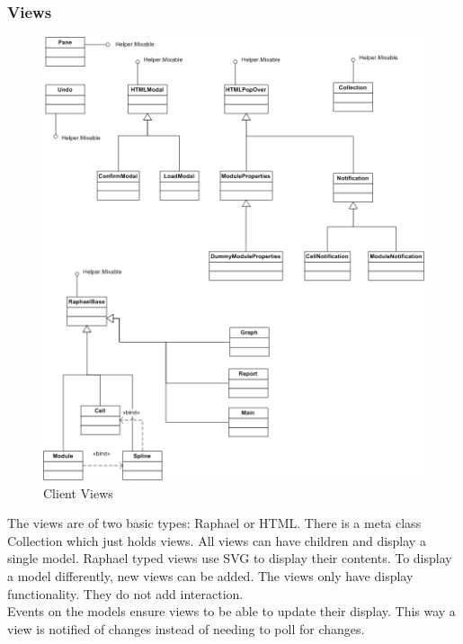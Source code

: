 \documentclass{report}
\begin{document}
				\subsubsection{Views}
					\begin{figure}[htb]
						\begin{center}
							\includegraphics[scale=0.675]{views.png}
							\caption{Client Views}
							\label{fig: cmodels}
						\end{center}
					\end{figure}	

					The views are of two basic types: Raphael or HTML. There is a meta class Collection which just holds views. All views can have children and display a single model. Raphael typed views use SVG to display their contents. To display a model differently, new views can be added. The views only have display functionality. They do not add interaction. \\
					Events on the models ensure views to be able to update their display. This way a view is notified of changes instead of needing to poll for changes.
					
\end{document}
